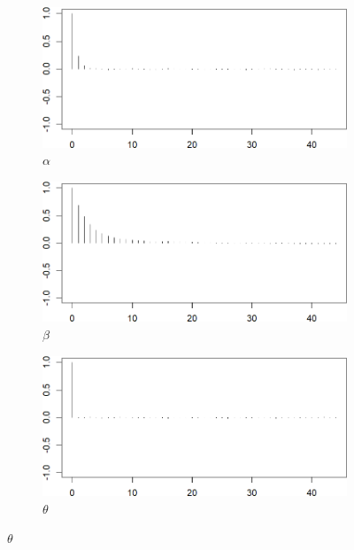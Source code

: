 \documentclass{Class/julia}
\begin{document}
\begin{figure}[!ht]
    \centering
    \caption{Autocorrelation Plots (\texttt{itamtplcost})}
    \label{fig:12}
    \begin{subfigure}{0.45\textwidth}
        \centering
        \includegraphics[width=\textwidth]{itamtplcost/acf_alpha.png}
        \caption{\( \alpha \)}
    \end{subfigure}
    \hfill
    \begin{subfigure}{0.45\textwidth}
        \centering
        \includegraphics[width=\textwidth]{itamtplcost/acf_beta.png}
        \caption{\( \beta \)}
    \end{subfigure}

    \vspace{1em}

    \begin{subfigure}{0.45\textwidth}
        \centering
        \includegraphics[width=\textwidth]{itamtplcost/acf_theta.png}
        \caption{\( \theta \)}
    \end{subfigure}
\end{figure}
\end{document}
